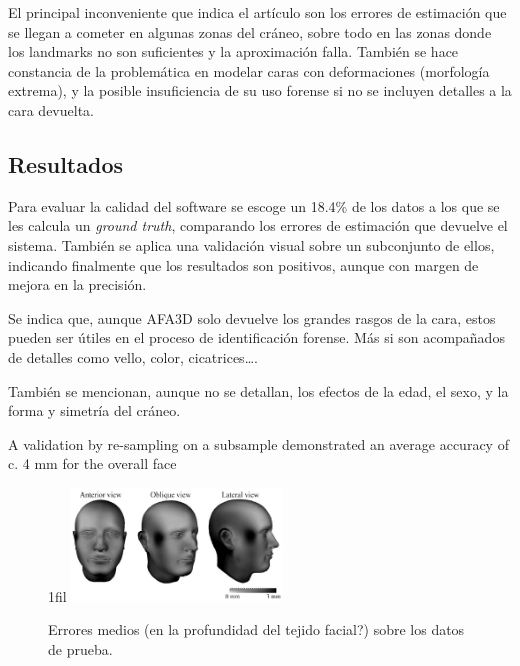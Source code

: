 \documentclass[13pt,a4paper]{article}
\makeatletter
\newcommand*{\centerfloat}{%
  \parindent \z@
  \leftskip \z@ \@plus 1fil \@minus \textwidth
  \rightskip\leftskip
  \parfillskip \z@skip}
\makeatother
\begin{document}

El principal inconveniente que indica el artículo son los errores de estimación que se llegan a cometer en algunas zonas del cráneo, sobre todo en las zonas donde los landmarks no son suficientes y la aproximación falla. También se hace constancia de la problemática en modelar caras con deformaciones (morfología extrema), y la posible insuficiencia de su uso forense si no se incluyen detalles a la cara devuelta.


\subsection{Resultados}

Para evaluar la calidad del software se escoge un 18.4\% de los datos a los que se les calcula un \textit{ground truth}, comparando los errores de estimación que devuelve el sistema.
También se aplica una validación visual sobre un subconjunto de ellos, indicando finalmente que los resultados son positivos, aunque con margen de mejora en la precisión. 

Se indica que, aunque AFA3D solo devuelve los grandes rasgos de la cara, estos pueden ser útiles en el proceso de identificación forense. Más si son acompañados de detalles como vello, color, cicatrices\dots.

También se mencionan, aunque no se detallan, los efectos de la edad, el sexo, y la forma y simetría del cráneo.


A validation by re-sampling on a subsample demonstrated an average accuracy
of c. 4 mm for the overall face

\begin{figure}[ht]
  \centerfloat
  \includegraphics[width=0.5\textwidth]{img/errors.png}
  \caption{Errores medios (en la profundidad del tejido facial?) sobre los datos de prueba.}
\end{figure}
\end{document}
